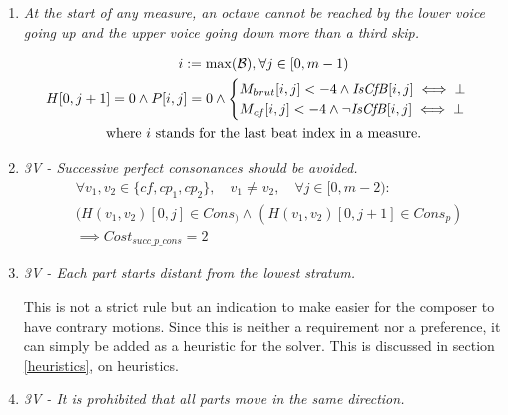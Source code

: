 \begin{enumerate}[wide, label=\bfseries 1.P\arabic*]
\item\label{rule:battuta}{ \textit{At the start of any measure, an octave cannot be reached by the lower voice going up and the upper voice going down more than a third skip.}}


\begin{equation}
    \begin{gathered}
        i := \max (\mathcal{B}), \forall j \in [0, m-1)\\
        H[0, j+1] = 0 \land P[i, j] = 0 \land \begin{cases}
            M_{brut}[i, j] < -4 \land \mathit{IsCfB}[i, j] \iff \bot\\
            M_{\mathit{cf}}[i, j] < -4 \land \lnot \mathit{IsCfB}[i, j] \iff \bot
        \end{cases}\\
        \text{where } i \text{ stands for the last beat index in a measure.}
    \end{gathered}
    \label{eq:battuta}
\end{equation}

\item \textit{3V - Successive perfect consonances should be avoided.}
\begin{equation} \begin{aligned}
    &\forall v_1, v_2 \in \{\mathit{cf}, cp_1, cp_2\}, \quad v_1 \neq v_2, \quad \forall j \in [0, m-2) \colon\\
    &(H(v_1,v_2)[0, j] \in Cons_) \land (H(v_1,v_2)[0, j+1] \in Cons_p)\\
    &\implies Cost_{succ\_p\_cons} = 2
    \end{aligned} \end{equation}

    \item  \textit{3V - Each part starts distant from the lowest stratum.}

    This is not a strict rule but an indication to make easier for the composer to have contrary motions. Since this is neither a requirement nor a preference, it can simply be added as a heuristic for the solver. This is discussed in section \ref{heuristics}, on heuristics.


    \item \textit{3V - It is prohibited that all parts move in the same direction.}


\end{enumerate}
